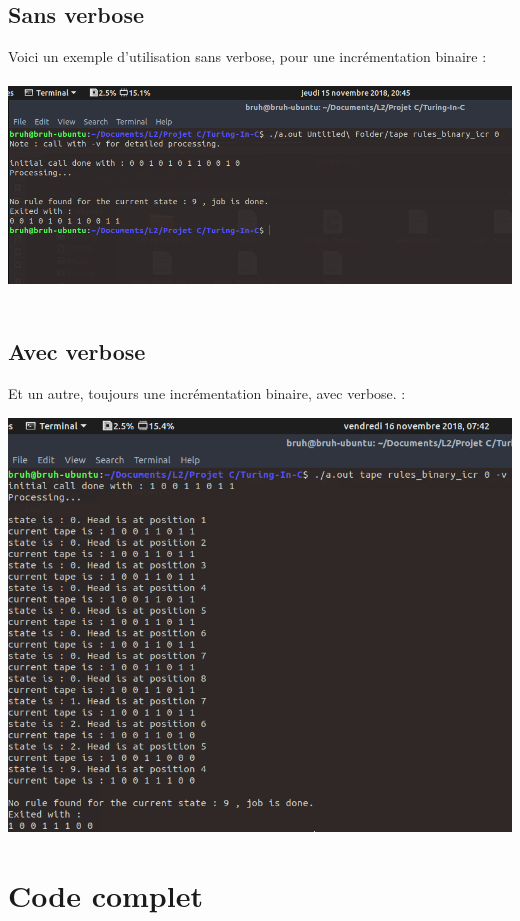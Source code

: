 \documentclass[12pt,a4paper]{report}
\begin{document}
\section{Sans verbose}
Voici un exemple d'utilisation sans verbose, pour une incrémentation binaire :\\ \\
\includegraphics[scale=2.0]{screen1.png}
\\ \\
\section{Avec verbose}
Et un autre, toujours une incrémentation binaire, avec verbose. :

\includegraphics[scale=1.9]{screen2.png}

\chapter{Code complet}

\end{document}

